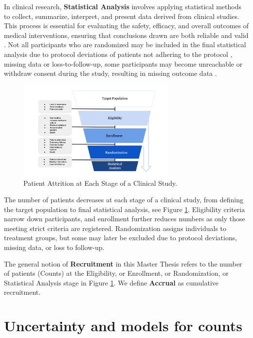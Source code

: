 In clinical research, \textbf{Statistical Analysis} involves applying statistical methods to collect, summarize, interpret, and present data derived from clinical studies. This process is essential for evaluating the safety, efficacy, and overall outcomes of medical interventions, ensuring that conclusions drawn are both reliable and valid \citep{panos2023statistical}. Not all participants who are randomized may be included in the final statistical analysis due to protocol deviations of patients not adhering to the protocol \citep{rehman2020exclusion}, missing data \citep{shih2002problems} or loss-to-follow-up, some participants may become unreachable or withdraw consent during the study, resulting in missing outcome data \citep{nuesch2009effects}.

\begin{figure}[h]
  \centering
  \includegraphics[width=0.7\textwidth]{fig_2_1.png}
  \caption{Patient Attrition at Each Stage of a Clinical Study.  \citep{piantadosi2022principles, whelan2018high, bogin2022lasagna}}
  \label{fig:2_1}
\end{figure}

The number of patients decreases at each stage of a clinical study, from defining the target population to final statistical analysis, see Figure \ref{fig:2_1}. Eligibility criteria narrow down participants, and enrollment further reduces numbers as only those meeting strict criteria are registered. Randomization assigns individuals to treatment groups, but some may later be excluded due to protocol deviations, missing data, or loss to follow-up. 

The general notion of \textbf{Recruitment} in this Master Thesis refers to the number of patients (Counts) at the Eligibility, or Enrollment, or Randomization, or Statistical Analysis stage in Figure \ref{fig:2_1}. We define \textbf{Accrual} as cumulative recruitment.

\section{Uncertainty and models for counts}

